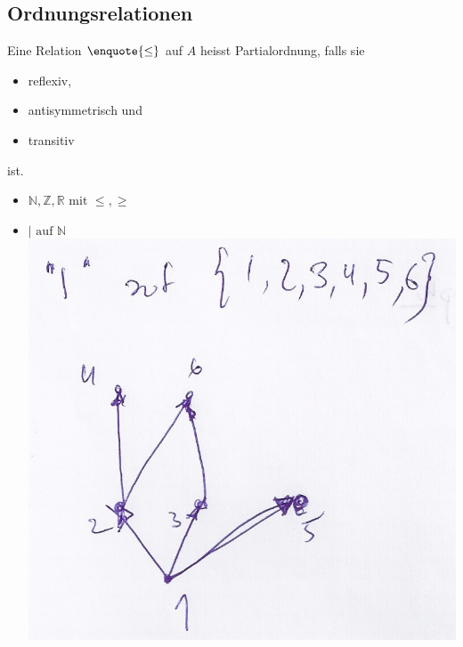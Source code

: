 \subsection{Ordnungsrelationen}
\begin{def*}[note = Partialordnung , index = Partialordnung]
	Eine Relation $\enquote{\leq}$ auf $A$ heisst Partialordnung, falls sie
	\begin{itemize}
		\item reflexiv,
		\item antisymmetrisch und
		\item transitiv
	\end{itemize}
	ist.
\end{def*}
\begin{bsp*}
	\begin{itemize}
		\item $\mathbb{N}, \mathbb{Z}, \mathbb{R} \text{ mit } \leq, \geq$
		\item $| \text{ auf } \mathbb{N}$ \\
			\includegraphics{Bild19} \\

\end{itemize}
\end{bsp*}
